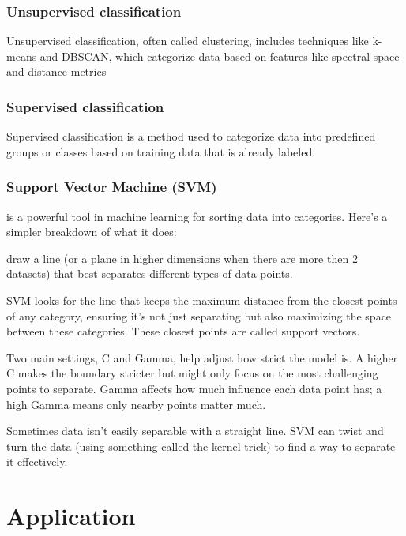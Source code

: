 \documentclass[
  letterpaper,
  DIV=11,
  numbers=noendperiod]{scrreprt}
\begin{document}
\subsubsection{Unsupervised
classification}\label{unsupervised-classification}

Unsupervised classification, often called clustering, includes
techniques like k-means and DBSCAN, which categorize data based on
features like spectral space and distance metrics

\subsubsection{Supervised
classification}\label{supervised-classification}

Supervised classification is a method used to categorize data into
predefined groups or classes based on training data that is already
labeled.

\subsubsection{Support Vector Machine
(SVM)}\label{support-vector-machine-svm}

is a powerful tool in machine learning for sorting data into categories.
Here's a simpler breakdown of what it does:

draw a line (or a plane in higher dimensions when there are more then 2
datasets) that best separates different types of data points.

SVM looks for the line that keeps the maximum distance from the closest
points of any category, ensuring it's not just separating but also
maximizing the space between these categories. These closest points are
called support vectors.

Two main settings, C and Gamma, help adjust how strict the model is. A
higher C makes the boundary stricter but might only focus on the most
challenging points to separate. Gamma affects how much influence each
data point has; a high Gamma means only nearby points matter much.

Sometimes data isn't easily separable with a straight line. SVM can
twist and turn the data (using something called the kernel trick) to
find a way to separate it effectively.

\section{Application}\label{application-5}
\end{document}
